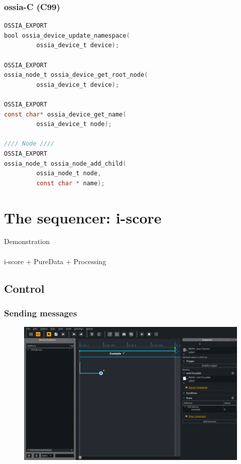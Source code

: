 \documentclass[handout]{beamer}
\begin{document}
\begin{frame}[fragile]
\frametitle{ossia-C (C99)}
\small
\begin{lstlisting}[language=C]
OSSIA_EXPORT
bool ossia_device_update_namespace(
         ossia_device_t device);

OSSIA_EXPORT
ossia_node_t ossia_device_get_root_node(
         ossia_device_t device);

OSSIA_EXPORT
const char* ossia_device_get_name(
         ossia_device_t node);

//// Node ////
OSSIA_EXPORT
ossia_node_t ossia_node_add_child(
         ossia_node_t node,
         const char * name);
\end{lstlisting}
\end{frame}

\section{The sequencer: i-score}

\begin{frame}
\centering
\Huge Demonstration
~\\
~\\
\Large i-score + PureData + Processing
\end{frame}

\subsection{Control}

\begin{frame}
\frametitle{Sending messages}
\Large
\begin{figure}
    \includegraphics[width=\textwidth]{images/state.png}
\end{figure}
\end{frame}
\end{document}
